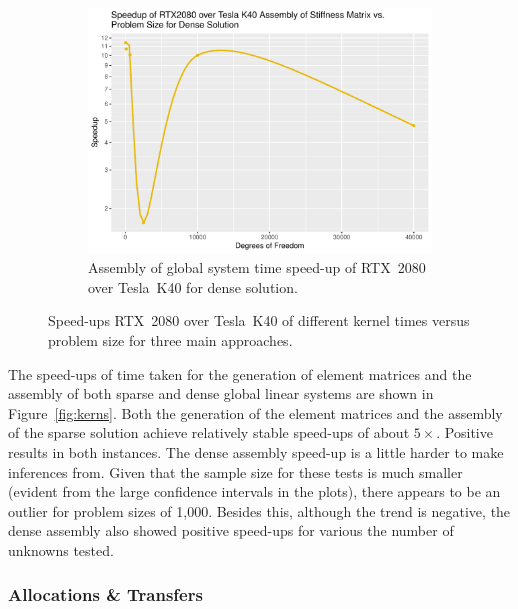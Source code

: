 \begin{figure}
\begin{subfigure}{0.48\linewidth}
		\centering
		\includegraphics[width=\linewidth]{Plots/assem_dense_rtx_speedup_vs_n}
		\caption{Assembly of global system time speed-up of RTX~2080 over Tesla~K40 for dense solution.}
		\label{fig:assem_rtx_dense}
	\end{subfigure}
	\caption{Speed-ups RTX~2080 over Tesla~K40 of different kernel times versus problem size for three main approaches.}
	\label{fig:kerns_rtx}
\end{figure}

The speed-ups of time taken for the generation of element matrices and the assembly of both sparse and dense global linear systems are shown in Figure~\ref{fig:kerns}. Both the generation of the element matrices and the assembly of the sparse solution achieve relatively stable speed-ups of about $5\times$.  Positive results in both instances. The dense assembly speed-up  is a little harder to make inferences from. Given that the sample size for these tests is much smaller (evident from the large confidence intervals in the plots), there appears to be an outlier for problem sizes of 1,000. Besides this, although the trend is negative, the dense assembly also showed positive speed-ups for various the number of unknowns tested.

\subsubsection{Allocations \& Transfers}

